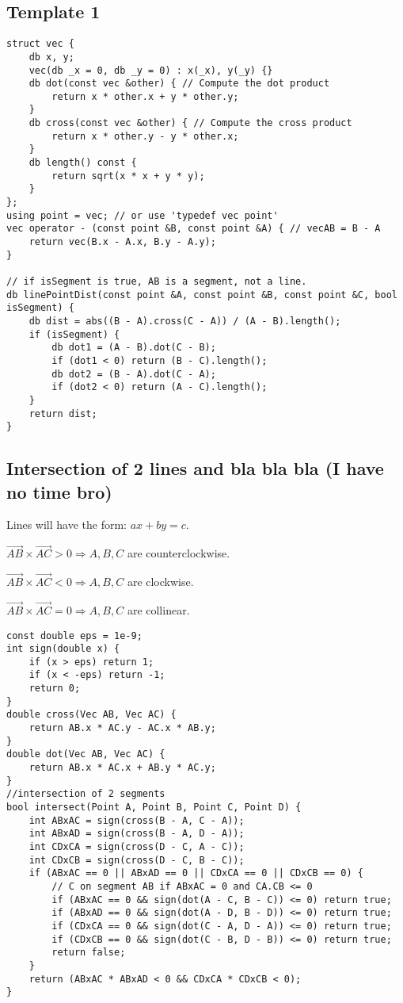 \documentclass[11pt,a4paper]{article}
\begin{document}
\begin{multicols*}{2}
\subsection{Template 1}
\begin{lstlisting}
struct vec {
    db x, y;
    vec(db _x = 0, db _y = 0) : x(_x), y(_y) {}
    db dot(const vec &other) { // Compute the dot product
        return x * other.x + y * other.y;
    }
    db cross(const vec &other) { // Compute the cross product
        return x * other.y - y * other.x;
    }
    db length() const {
        return sqrt(x * x + y * y);
    }
};
using point = vec; // or use 'typedef vec point'
vec operator - (const point &B, const point &A) { // vecAB = B - A
    return vec(B.x - A.x, B.y - A.y);
}

// if isSegment is true, AB is a segment, not a line.
db linePointDist(const point &A, const point &B, const point &C, bool isSegment) {
    db dist = abs((B - A).cross(C - A)) / (A - B).length();
    if (isSegment) {
        db dot1 = (A - B).dot(C - B);
        if (dot1 < 0) return (B - C).length();
        db dot2 = (B - A).dot(C - A);
        if (dot2 < 0) return (A - C).length();
    }
    return dist;
}
\end{lstlisting}

\subsection{Intersection of 2 lines and bla bla bla (I have no time bro)}
Lines will have the form: $ax + by = c$.

$\vec{AB} \times \vec{AC} > 0 \Rightarrow  A, B, C$ are counterclockwise.

$\vec{AB} \times \vec{AC} < 0 \Rightarrow  A, B, C$ are clockwise.

$\vec{AB} \times \vec{AC} = 0 \Rightarrow  A, B, C$ are collinear.

\begin{lstlisting}
const double eps = 1e-9;
int sign(double x) {
    if (x > eps) return 1;
    if (x < -eps) return -1;
    return 0;
}
double cross(Vec AB, Vec AC) {
    return AB.x * AC.y - AC.x * AB.y;
}
double dot(Vec AB, Vec AC) {
    return AB.x * AC.x + AB.y * AC.y;
}
//intersection of 2 segments
bool intersect(Point A, Point B, Point C, Point D) {
    int ABxAC = sign(cross(B - A, C - A));
    int ABxAD = sign(cross(B - A, D - A));
    int CDxCA = sign(cross(D - C, A - C));
    int CDxCB = sign(cross(D - C, B - C));
    if (ABxAC == 0 || ABxAD == 0 || CDxCA == 0 || CDxCB == 0) {
        // C on segment AB if ABxAC = 0 and CA.CB <= 0
        if (ABxAC == 0 && sign(dot(A - C, B - C)) <= 0) return true;
        if (ABxAD == 0 && sign(dot(A - D, B - D)) <= 0) return true;
        if (CDxCA == 0 && sign(dot(C - A, D - A)) <= 0) return true;
        if (CDxCB == 0 && sign(dot(C - B, D - B)) <= 0) return true;
        return false;
    }
    return (ABxAC * ABxAD < 0 && CDxCA * CDxCB < 0);
}
\end{lstlisting}


\end{multicols*}
\end{document}
